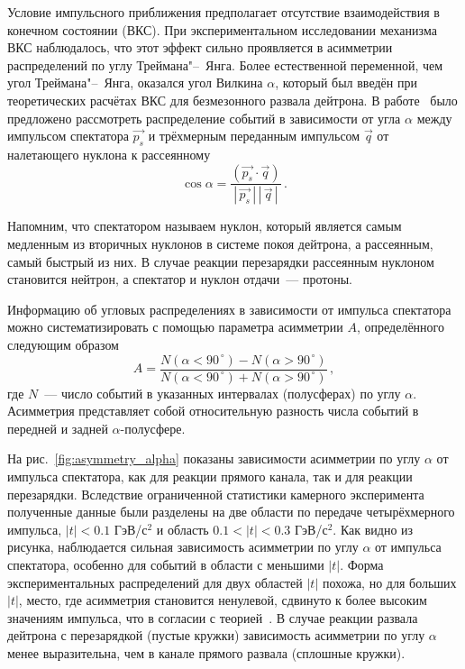 Условие импульсного приближения предполагает отсутствие взаимодействия в
конечном состоянии (ВКС). При экспериментальном исследовании механизма ВКС
наблюдалось, что этот эффект сильно проявляется в асимметрии распределений по
углу Треймана"--~Янга. Более естественной переменной, чем угол Треймана"--~Янга,
оказался угол Вилкина $\alpha$, который был введён при теоретических расчётах
ВКС для безмезонного развала дейтрона. В работе~\cite{alad77} было предложено
рассмотреть распределение событий в зависимости от угла $\alpha$ между импульсом
спектатора $\vec{p_s}$ и трёхмерным переданным импульсом $\vec{q}$ от
налетающего нуклона к рассеянному
\begin{equation}
  \cos{\alpha} = \frac{(\vec{p_s}\cdot\vec{q})}
      {|\,\vec{p_s}\,|\,|\,\vec{q}\,|}\,.
\end{equation}

Напомним, что спектатором называем нуклон, который является самым медленным из
вторичных нуклонов в системе покоя дейтрона, а рассеянным, самый быстрый из
них. В случае реакции перезарядки \dpchex рассеянным нуклоном становится
нейтрон, а спектатор и нуклон отдачи~--- протоны.

Информацию об угловых распределениях в зависимости от импульса спектатора можно
систематизировать с помощью параметра асимметрии $A$, определённого следующим
образом
\begin{equation}
  A = \frac{N(\alpha < 90^{\,\circ}) - N(\alpha > 90^{\,\circ})}
  {N(\alpha < 90^{\,\circ}) + N(\alpha > 90^{\,\circ})}\,,
\end{equation}
где $N$~--- число событий в указанных интервалах (полусферах) по углу
$\alpha$. Асимметрия представляет собой относительную разность числа событий в
передней и задней $\alpha$-полусфере.

На рис.~\ref{fig:asymmetry_alpha} показаны зависимости асимметрии по углу
$\alpha$ от импульса спектатора, как для реакции прямого канала, так и для
реакции перезарядки. Вследствие ограниченной статистики камерного эксперимента
полученные данные были разделены на две области по передаче четырёхмерного
импульса, $|t| < 0.1$ ГэВ/с$^2$ и область $0.1 < |t| < 0.3$ ГэВ/с$^2$. Как видно
из рисунка, наблюдается сильная зависимость асимметрии по углу $\alpha$ от
импульса спектатора, особенно для событий в области с меньшими $|t|$. Форма
экспериментальных распределений для двух областей $|t|$ похожа, но для больших
$|t|$, место, где асимметрия становится ненулевой, сдвинуто к более высоким
значениям импульса, что в согласии с теорией~\cite{alad77}. В случае реакции
развала дейтрона с перезарядкой (пустые кружки) зависимость асимметрии по углу
$\alpha$ менее выразительна, чем в канале прямого развала (сплошные кружки).

